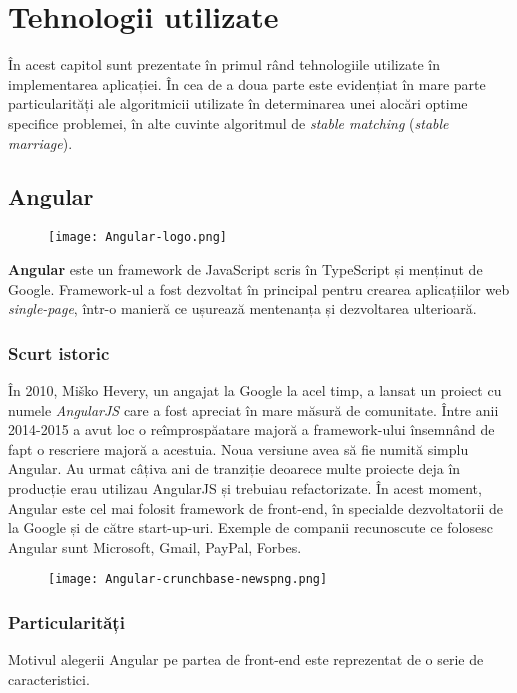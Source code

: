 \chapter{Tehnologii utilizate}

În acest capitol sunt prezentate în primul rând tehnologiile utilizate în implementarea aplicației. În cea de a doua parte este evidențiat în mare parte particularități ale algoritmicii utilizate în determinarea unei alocări optime specifice problemei, în alte cuvinte algoritmul de \textit{stable matching} (\textit{stable marriage}).

\section{Angular}
\begin{figure}[H]
	\texttt{[image: Angular-logo.png]}
\end{figure}

\textbf{Angular} este un framework de JavaScript scris în TypeScript și menținut de Google. Framework-ul a fost dezvoltat în principal pentru crearea aplicațiilor web \textit{single-page}, într-o manieră ce ușurează mentenanța și dezvoltarea ulterioară.

\subsection{Scurt istoric}
În 2010, Miško Hevery, un angajat la Google la acel timp, a lansat un proiect cu numele \textit{AngularJS} care a fost apreciat în mare măsură de comunitate. Între anii 2014-2015 a avut loc o reîmprospăatare majoră a framework-ului însemnând de fapt o rescriere majoră a acestuia. Noua versiune avea să fie numită simplu Angular. Au urmat câțiva ani de tranziție deoarece multe proiecte deja în producție erau utilizau AngularJS și  trebuiau refactorizate. În acest moment, Angular este cel mai folosit framework de front-end, în specialde dezvoltatorii de la Google și de către start-up-uri. Exemple de companii recunoscute ce folosesc Angular sunt Microsoft, Gmail, PayPal, Forbes.

\begin{figure}[H]
	\centering
	\texttt{[image: Angular-crunchbase-newspng.png]}
	\caption{\cite{angular-stats}}
\end{figure}

\subsection{Particularități}
Motivul alegerii Angular pe partea de front-end este reprezentat de o serie de caracteristici.

